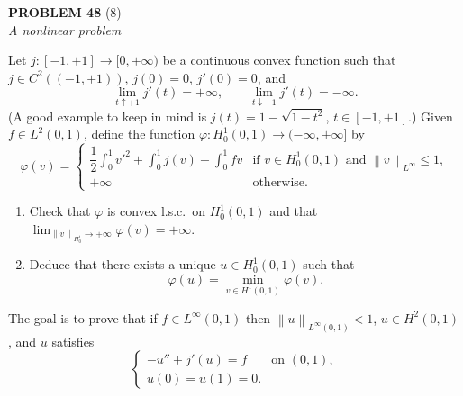 \documentclass[12pt]{article}
\newcommand{\norm}[1]{\left\|#1\right\|}
\begin{document}
\bigskip
 
\noindent\textbf{PROBLEM 48} (8)\\[4pt]
\textit{A nonlinear problem}
 
\medskip
 
Let $j : [-1,+1] \to [0,+\infty)$ be a continuous convex function such that
$j \in C^2((-1,+1))$, $j(0) = 0$, $j'(0) = 0$, and
\[
\lim_{t \uparrow +1} j'(t) = +\infty, \qquad \lim_{t \downarrow -1} j'(t) = -\infty.
\]
(A good example to keep in mind is $j(t) = 1 - \sqrt{1-t^2}$, $t \in [-1,+1]$.)
Given $f \in L^2(0,1)$, define the function $\varphi : H^1_0(0,1) \to (-\infty,+\infty]$ by
\[
\varphi(v) =
\begin{cases}
\dfrac{1}{2}\displaystyle\int_0^1 v'^2 + \int_0^1 j(v) - \int_0^1 fv
& \text{if } v \in H^1_0(0,1) \text{ and } \norm{v}_{L^\infty} \le 1,\\[8pt]
+\infty & \text{otherwise.}
\end{cases}
\]
 
\begin{enumerate}
\item Check that $\varphi$ is convex l.s.c.\ on $H^1_0(0,1)$ and that
$\lim_{\norm{v}_{H^1_0} \to +\infty} \varphi(v) = +\infty$.
 
\item Deduce that there exists a unique $u \in H^1_0(0,1)$ such that
\[
\varphi(u) = \min_{v \in H^1(0,1)} \varphi(v).
\]
\end{enumerate}
 
\noindent The goal is to prove that if $f \in L^\infty(0,1)$ then $\norm{u}_{L^\infty(0,1)} < 1$,
$u \in H^2(0,1)$, and $u$ satisfies
\begin{equation}\tag{1}
\begin{cases}
-u'' + j'(u) = f & \text{on } (0,1),\\
u(0) = u(1) = 0.
\end{cases}
\end{equation}
 
\end{document}
